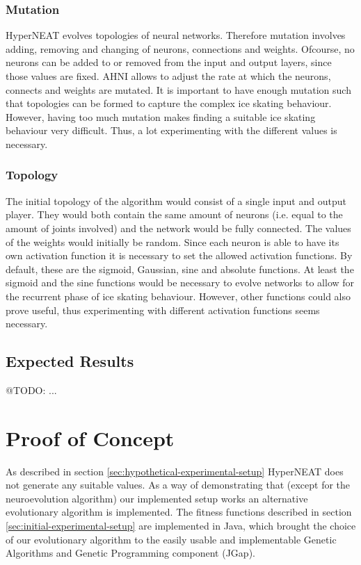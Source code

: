 \documentclass[a4paper,10pt]{article}
\begin{document}
\subsubsection{Mutation}
HyperNEAT evolves topologies of neural networks. Therefore mutation involves adding, removing and changing of neurons, connections and weights. Ofcourse, no neurons can be added to or removed from the input and output layers, since those values are fixed. AHNI allows to adjust the rate at which the neurons, connects and weights are mutated. It is important to have enough mutation such that topologies can be formed to capture the complex ice skating behaviour. However, having too much mutation makes finding a suitable ice skating behaviour very difficult. Thus, a lot experimenting with the different values is necessary. 

\subsubsection{Topology}
The initial topology of the algorithm would consist of a single input and output player. They would both contain the same amount of neurons (i.e. equal to the amount of joints involved) and the network would be fully connected. The values of the weights would initially be random. Since each neuron is able to have its own activation function it is necessary to set the allowed activation functions. By default, these are the sigmoid, Gaussian, sine and absolute functions. At least the sigmoid and the sine functions would be necessary to evolve networks to allow for the recurrent phase of ice skating behaviour. However, other functions could also prove useful, thus experimenting with different activation functions seems necessary.

\subsection{Expected Results}
@TODO: ...


\section{Proof of Concept}
\label{sec:proof-of-concept}
As described in section \ref{sec:hypothetical-experimental-setup} HyperNEAT does not generate any suitable values. As a way of demonstrating that (except for the neuroevolution algorithm) our implemented setup works an alternative evolutionary algorithm is implemented. The fitness functions described in section \ref{sec:initial-experimental-setup} are implemented in Java, which brought the choice of our evolutionary algorithm to the easily usable and implementable Genetic Algorithms and Genetic Programming component (JGap). 
\end{document}
